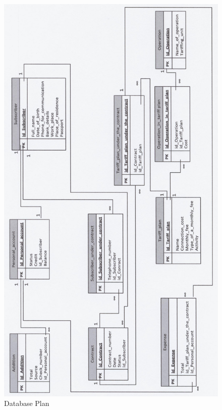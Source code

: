 
\begin{figure}[th]
\begin{center}
\includegraphics[scale=0.7]{IMG4}
\end{center}
\caption{Database Plan}
\label{block}
\end{figure}
